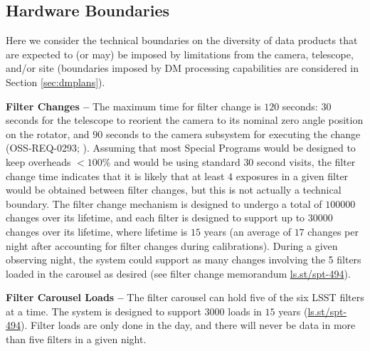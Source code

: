 \documentclass[DM,lsstdoc,toc]{lsstdoc}
\begin{document}
\subsection{Hardware Boundaries}\label{ssec:data_bounds}

Here we consider the technical boundaries on the diversity of data products that are expected to (or may) be imposed by limitations from the camera, telescope, and/or site (boundaries imposed by DM processing capabilities are considered in Section \ref{sec:dmplans}). 

{\bf Filter Changes -- } The maximum time for filter change is $120$ seconds: $30$ seconds for the telescope to reorient the camera to its nominal zero angle position on the rotator, and $90$ seconds to the camera subsystem for executing the change (OSS-REQ-0293; ).
Assuming that most Special Programs would be designed to keep overheads $<100\%$ and would be using standard $30$ second visits, the filter change time indicates that it is likely that at least $4$ exposures in a given filter would be obtained between filter changes, but this is not actually a technical boundary. 
The filter change mechanism is designed to undergo a total of $100000$ changes over its lifetime, and each filter is designed to support up to $30000$ changes over its lifetime, where lifetime is $15$ years (an average of $17$ changes per night after accounting for filter changes during calibrations).
During a given observing night, the system could support as many changes involving the 5 filters loaded in the carousel as desired (see filter change memorandum \url{ls.st/spt-494}).

{\bf Filter Carousel Loads -- } The filter carousel can hold five of the six LSST filters at a time.
The system is designed to support $3000$ loads in $15$ years (\url{ls.st/spt-494}).
Filter loads are only done in the day, and there will never be data in more than five filters in a given night.
\end{document}
